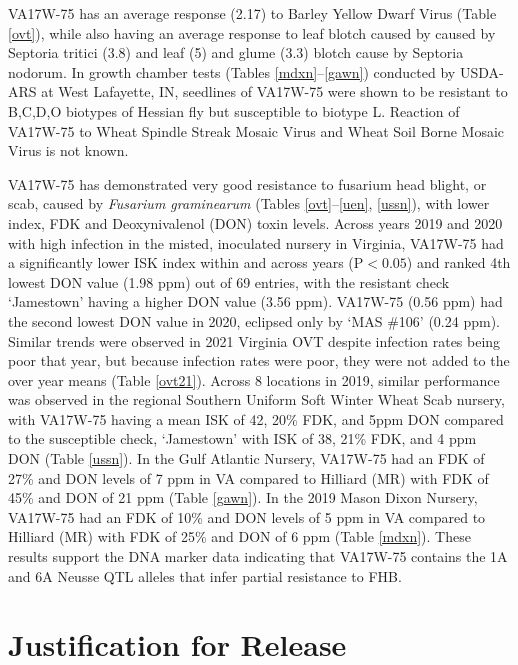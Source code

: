 \documentclass[12pt, letterpaper]{article}
\begin{document}
VA17W-75 has an average response (2.17) to Barley Yellow Dwarf Virus (Table \ref{ovt}), while also having an average response to leaf blotch caused by caused by Septoria tritici (3.8) and leaf (5) and glume (3.3) blotch cause by Septoria nodorum.  In growth chamber tests (Tables \ref{mdxn}--\ref{gawn}) conducted by USDA-ARS at West Lafayette, IN, seedlines of VA17W-75 were shown to be resistant to B,C,D,O biotypes of Hessian fly but susceptible to biotype L. Reaction of VA17W-75 to Wheat Spindle Streak Mosaic Virus and Wheat Soil Borne Mosaic Virus is not known.

VA17W-75 has demonstrated very good resistance to fusarium head blight, or scab, caused by \textit{Fusarium graminearum} (Tables \ref{ovt}--\ref{uen}, \ref{ussn}), with lower index, FDK and Deoxynivalenol (DON) toxin levels. Across years 2019 and 2020 with high infection in the misted, inoculated nursery in Virginia, VA17W-75 had a significantly lower ISK index within and across years (P$<0.05$) and ranked 4th lowest DON value (1.98 ppm) out of 69 entries, with the resistant check `Jamestown' having a higher DON value (3.56 ppm). VA17W-75 (0.56 ppm) had the second lowest DON value in 2020, eclipsed only by `MAS {\#}106' (0.24 ppm). Similar trends were observed in 2021 Virginia OVT despite infection rates being poor that year, but because infection rates were poor, they were not added to the over year means (Table \ref{ovt21}). Across 8 locations in 2019, similar performance was observed in the regional Southern Uniform Soft Winter Wheat Scab nursery, with VA17W-75 having a mean ISK of 42, 20\% FDK, and 5ppm DON compared to the susceptible check, `Jamestown' with ISK of 38, 21\% FDK, and 4 ppm DON (Table \ref{ussn}). In the Gulf Atlantic Nursery, VA17W-75 had an FDK of 27\% and DON levels of 7 ppm in VA compared to Hilliard (MR) with FDK of 45\% and DON of 21 ppm (Table \ref{gawn}). In the 2019 Mason Dixon Nursery, VA17W-75 had an FDK of 10\% and DON levels of 5 ppm in VA compared to Hilliard (MR) with FDK of 25\% and DON of 6 ppm (Table \ref{mdxn}). These results support the DNA marker data indicating that VA17W-75 contains the 1A and 6A Neusse QTL alleles that infer partial resistance to FHB. 

\section{Justification for Release}
\end{document}
